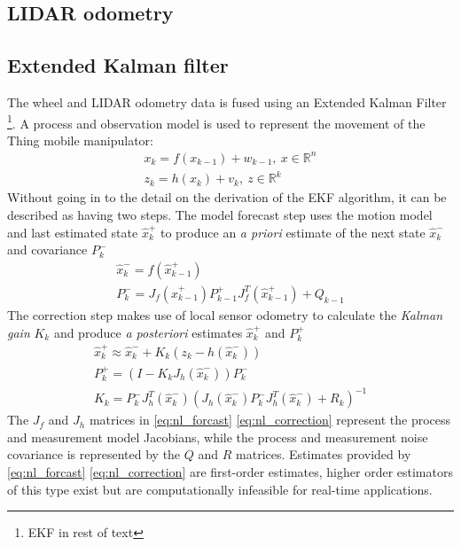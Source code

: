 \documentclass[times, utf8, diplomski, english]{fer}
\begin{document}
\subsection{LIDAR odometry}
\subsection{Extended Kalman filter}
The wheel and LIDAR odometry data is fused using an Extended Kalman Filter \footnote{EKF in rest of text}\citep{MooreStouchKeneralizedEkf2014}.
A process and observation model is used to represent the movement of the Thing mobile manipulator:
\begin{subequations}\label{state_space_nl2}
\begin{gather}
x_k = f\left(x_{k-1}\right) + w_{k-1} , \ x \in \mathbb{R}^n \\
z_k = h\left(x_k\right) + v_k, \ z \in \mathbb{R}^k
\end{gather}
\end{subequations}
Without going in to the detail on the derivation of the EKF algorithm, it can be described as having two steps.
The model forecast step uses the motion model and last estimated state $\hat{x}_k^+$ to produce an \textit{a priori} estimate of the next state $\hat{x}_k^-$ and covariance $P_k^-$
\begin{subequations}\label{eq:nl_forcast}
\begin{gather}
\hat{x}_k^- = f\left(\hat{x}_{k-1}^+\right) \\
P_k^- = J_f\left(\hat{x}_{k-1}^+\right)P_{k-1}^+J_f^T\left(\hat{x}_{k-1}^+\right) + Q_{k-1}
\end{gather}
\end{subequations}
The correction step makes use of local sensor odometry to calculate the \textit{Kalman gain} $K_k$ and produce \textit{a posteriori} estimates $\hat{x}_k^+$ and $P_k^+$ 
\begin{subequations}\label{eq:nl_correction}
\begin{gather}
\hat{x}_k^+ \approx \hat{x}_k^- + K_k\left(z_k - h\left(\hat{x}_k^-\right)\right) \\
P_k^+ = \left(I - K_kJ_h\left(\hat{x}_k^-\right)\right)P_k^- \\
K_k = P_k^-J_h^T\left(\hat{x}_k^-\right)\left(J_h\left(\hat{x}_k^-\right)P_k^-J_h^T\left(\hat{x}_k^-\right) + R_k\right)^{-1} 
\end{gather}
\end{subequations}
The $J_f$ and $J_h$ matrices in \eqref{eq:nl_forcast} \eqref{eq:nl_correction} represent the process and measurement model Jacobians, while the process and measurement noise covariance is represented by the $Q$ and $R$ matrices.
Estimates provided by \eqref{eq:nl_forcast} \eqref{eq:nl_correction} are first-order estimates, higher order estimators of this type exist but are computationally infeasible for real-time applications.
\end{document}
